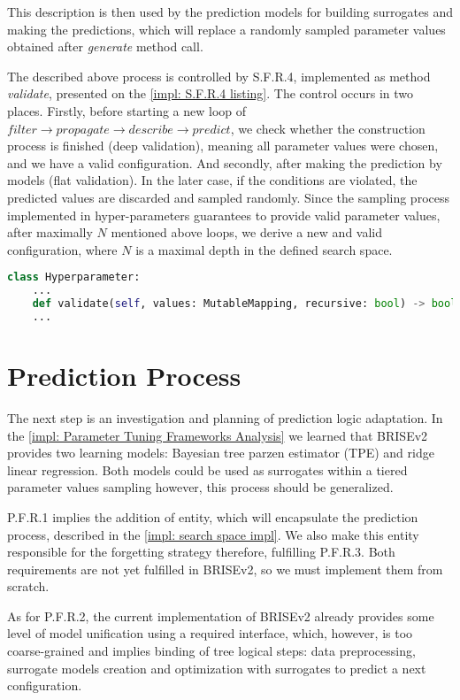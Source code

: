 This description is then used by the prediction models for building surrogates and making the predictions, which will replace a randomly sampled parameter values obtained after \emph{generate} method call.

The described above process is controlled by S.F.R.4, implemented as method \emph{validate}, presented on the \cref{impl: S.F.R.4 listing}. The control occurs in two places. Firstly, before starting a new loop of $filter \rightarrow propagate \rightarrow describe \rightarrow predict$, we check whether the construction process is finished (deep validation), meaning all parameter values were chosen, and we have a valid configuration. And secondly, after making the prediction by models (flat validation). In the later case, if the conditions are violated, the predicted values are discarded and sampled randomly. Since the sampling process implemented in hyper-parameters guarantees to provide valid parameter values, after maximally $N$ mentioned above loops, we derive a new and valid configuration, where $N$ is a maximal depth in the defined search space.

\begin{lstlisting}[language=Python, caption=S.F.R.4 implementation., label=impl: S.F.R.4 listing]
class Hyperparameter:
	...
	def validate(self, values: MutableMapping, recursive: bool) -> bool: pass
	...
\end{lstlisting}


\section{Prediction Process}\label{impl: prediction logic}
The next step is an investigation and planning of prediction logic adaptation.
In the \cref{impl: Parameter Tuning Frameworks Analysis} we learned that BRISEv2 provides two learning models: Bayesian tree parzen estimator (TPE) and ridge linear regression. Both models could be used as surrogates within a tiered parameter values sampling however, this process should be generalized.

P.F.R.1 implies the addition of entity, which will encapsulate the prediction process, described in the \cref{impl: search space impl}. We also make this entity responsible for the forgetting strategy therefore, fulfilling P.F.R.3. Both requirements are not yet fulfilled in BRISEv2, so we must implement them from scratch.

As for P.F.R.2, the current implementation of BRISEv2 already provides some level of model unification using a required interface, which, however, is too coarse-grained and implies binding of tree logical steps: data preprocessing, surrogate models creation and optimization with surrogates to predict a next configuration.

